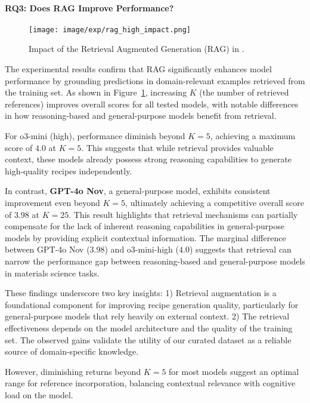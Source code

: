 \paragraph*{RQ3: Does RAG Improve Performance?}
\begin{figure}[!h]
    \centering
    \texttt{[image: image/exp/rag\_high\_impact.png]}
    \caption{Impact of the Retrieval Augmented Generation (RAG) in \testhi.}
    \label{fig:rag_high_impact}
\end{figure}
The experimental results confirm that RAG significantly enhances model performance by grounding predictions in domain-relevant examples retrieved from the training set. As shown in Figure~\ref{fig:rag_high_impact}, increasing \(K\) (the number of retrieved references) improves overall scores for all tested models, with notable differences in how reasoning-based and general-purpose models benefit from retrieval.

For o3-mini (high), performance diminish beyond \(K=5\), achieving a maximum score of \(4.0\) at \(K=5\). This suggests that while retrieval provides valuable context, these models already possess strong reasoning capabilities to generate high-quality recipes independently.

In contrast, \textbf{GPT-4o Nov}, a general-purpose model, exhibits consistent improvement even beyond \(K=5\), ultimately achieving a competitive overall score of \(3.98\) at \(K=25\). This result highlights that retrieval mechanisms can partially compensate for the lack of inherent reasoning capabilities in general-purpose models by providing explicit contextual information. The marginal difference between GPT-4o Nov (\(3.98\)) and o3-mini-high (\(4.0\)) suggests that retrieval can narrow the performance gap between reasoning-based and general-purpose models in materials science tasks.

These findings underscore two key insights:
1) Retrieval augmentation is a foundational component for improving recipe generation quality, particularly for general-purpose models that rely heavily on external context.
2) The retrieval effectiveness depends on the model architecture and the quality of the training set. The observed gains validate the utility of our curated dataset as a reliable source of domain-specific knowledge.

However, diminishing returns beyond \(K=5\) for most models suggest an optimal range for reference incorporation, balancing contextual relevance with cognitive load on the model.